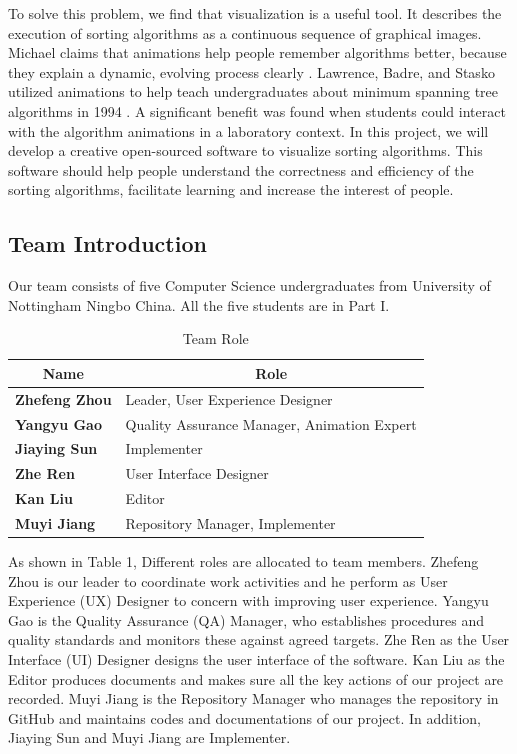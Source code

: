\documentclass[paper=a4, fontsize=11pt,twoside]{scrartcl}		%
\begin{document}
To solve this problem, we find that visualization is a useful tool. It describes the execution of sorting algorithms as a continuous sequence of graphical images. Michael claims that animations help people remember algorithms better, because they explain a dynamic, evolving process clearly \cite{Intro.2}. Lawrence, Badre, and Stasko utilized animations to help teach undergraduates about minimum spanning tree algorithms in 1994 \cite{Intro.3}. A significant benefit was found when students could interact with the algorithm animations in a laboratory context. In this project, we will develop a creative open-sourced software to visualize sorting algorithms. This software should help people understand the correctness and efficiency of the sorting algorithms, facilitate learning and increase the interest of people. 


\subsection{Team Introduction}
Our team consists of five Computer Science undergraduates from University of Nottingham Ningbo China. All the five students are in Part I.

\begin{table}[H]
\caption{Team Role}
\begin{center}
\begin{tabular}{|l|l|}
\hline
\multicolumn{1}{|c|}{\textbf{Name}} &
\multicolumn{1}{|c|}{\textbf{Role}}\\
\hline 
\textbf{Zhefeng Zhou} & Leader, User Experience Designer\\
\hline
\textbf{Yangyu Gao} & Quality Assurance Manager, Animation Expert\\
\hline
\textbf{Jiaying Sun} & Implementer \\
\hline
\textbf{Zhe Ren} & User Interface Designer    \\
\hline
\textbf{Kan Liu} & Editor   \\ 
\hline
\textbf{Muyi Jiang} & Repository Manager, Implementer   \\
\hline
\end{tabular}
\end{center}
\end{table}

As shown in Table 1, Different roles are allocated to team members. Zhefeng Zhou is our leader to coordinate work activities and he perform as User Experience (UX) Designer to concern with improving user experience. Yangyu Gao is the Quality Assurance (QA) Manager, who establishes procedures and quality standards and monitors these against agreed targets. Zhe Ren as the User Interface (UI) Designer designs the user interface of the software. Kan Liu as the Editor produces documents and makes sure all the key actions of our project are recorded. Muyi Jiang is the Repository Manager who manages the repository in GitHub and maintains codes and documentations  of our project. In addition, Jiaying Sun and Muyi Jiang are Implementer. 
\end{document}
